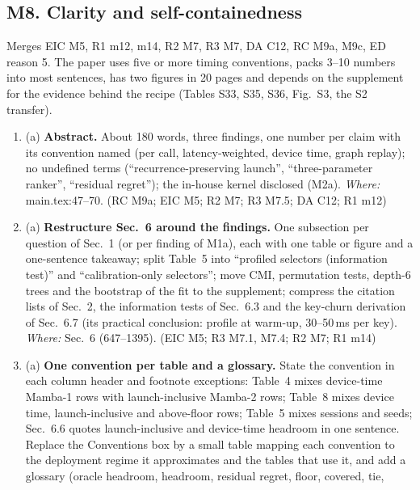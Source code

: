 \documentclass[11pt]{article}
\begin{document}
\subsection*{M8. Clarity and self-containedness}
Merges EIC M5, R1 m12, m14, R2 M7, R3 M7, DA C12, RC M9a, M9c, ED reason 5.
The paper uses five or more timing conventions, packs 3--10 numbers into most
sentences, has two figures in 20 pages and depends on the supplement for the
evidence behind the recipe (Tables S33, S35, S36, Fig.~S3, the S2 transfer).

\begin{enumerate}[label=M8\alph*.]
  \item (a) \textbf{Abstract.} About 180 words, three findings, one number per
        claim with its convention named (per call, latency-weighted, device
        time, graph replay); no undefined terms (``recurrence-preserving
        launch'', ``three-parameter ranker'', ``residual regret''); the
        in-house kernel disclosed (M2a). \emph{Where:} main.tex:47--70. (RC
        M9a; EIC M5; R2 M7; R3 M7.5; DA C12; R1 m12)
  \item (a) \textbf{Restructure Sec.~6 around the findings.} One subsection
        per question of Sec.~1 (or per finding of M1a), each with one table or
        figure and a one-sentence takeaway; split Table~5 into ``profiled
        selectors (information test)'' and ``calibration-only selectors'';
        move CMI, permutation tests, depth-6 trees and the bootstrap of the
        fit to the supplement; compress the citation lists of Sec.~2, the
        information tests of Sec.~6.3 and the key-churn derivation of
        Sec.~6.7 (its practical conclusion: profile at warm-up, 30--50\,ms per
        key). \emph{Where:} Sec.~6 (647--1395). (EIC M5; R3 M7.1, M7.4; R2 M7;
        R1 m14)
  \item (a) \textbf{One convention per table and a glossary.} State the
        convention in each column header and footnote exceptions: Table~4
        mixes device-time Mamba-1 rows with launch-inclusive Mamba-2 rows;
        Table~8 mixes device time, launch-inclusive and above-floor rows;
        Table~5 mixes sessions and seeds; Sec.~6.6 quotes launch-inclusive
        and device-time headroom in one sentence. Replace the Conventions box
        by a small table mapping each convention to the deployment regime it
        approximates and the tables that use it, and add a glossary (oracle
        headroom, headroom, residual regret, floor, covered, tie,

\end{enumerate}
\end{document}
